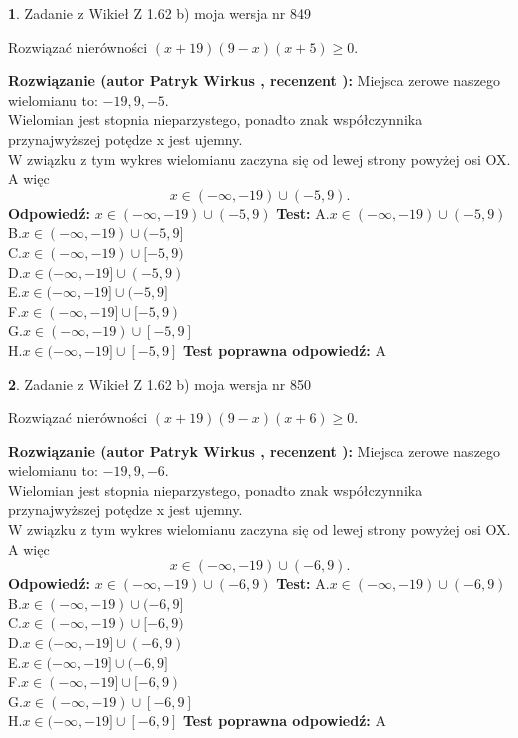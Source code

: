 \documentclass[12pt, a4paper]{article}
\theoremstyle{definition} %
\newtheorem{zad}{}
\newcommand{\zadStart}[1]{\begin{zad}#1\newline}
\newcommand{\zadStop}{\end{zad}}
\newcommand{\rozwStart}[2]{\noindent \textbf{Rozwiązanie (autor #1 , recenzent #2): }\newline}
\newcommand{\rozwStop}{\newline}
\newcommand{\odpStart}{\noindent \textbf{Odpowiedź:}\newline}
\newcommand{\odpStop}{\newline}
\newcommand{\testStart}{\noindent \textbf{Test:}\newline}
\newcommand{\testStop}{\newline}
\newcommand{\kluczStart}{\noindent \textbf{Test poprawna odpowiedź:}\newline}
\newcommand{\kluczStop}{\newline}
\begin{document}
\zadStart{Zadanie z Wikieł Z 1.62 b) moja wersja nr 849}

Rozwiązać nierówności $(x+19)(9-x)(x+5)\ge0$.
\zadStop
\rozwStart{Patryk Wirkus}{}
Miejsca zerowe naszego wielomianu to: $-19, 9, -5$.\\
Wielomian jest stopnia nieparzystego, ponadto znak współczynnika przy\linebreak najwyższej potędze x jest ujemny.\\ W związku z tym wykres wielomianu zaczyna się od lewej strony powyżej osi OX. A więc $$x \in (-\infty,-19) \cup (-5,9).$$
\rozwStop
\odpStart
$x \in (-\infty,-19) \cup (-5,9)$
\odpStop
\testStart
A.$x \in (-\infty,-19) \cup (-5,9)$\\
B.$x \in (-\infty,-19) \cup (-5,9]$\\
C.$x \in (-\infty,-19) \cup [-5,9)$\\
D.$x \in (-\infty,-19] \cup (-5,9)$\\
E.$x \in (-\infty,-19] \cup (-5,9]$\\
F.$x \in (-\infty,-19] \cup [-5,9)$\\
G.$x \in (-\infty,-19) \cup [-5,9]$\\
H.$x \in (-\infty,-19] \cup [-5,9]$
\testStop
\kluczStart
A
\kluczStop



\zadStart{Zadanie z Wikieł Z 1.62 b) moja wersja nr 850}

Rozwiązać nierówności $(x+19)(9-x)(x+6)\ge0$.
\zadStop
\rozwStart{Patryk Wirkus}{}
Miejsca zerowe naszego wielomianu to: $-19, 9, -6$.\\
Wielomian jest stopnia nieparzystego, ponadto znak współczynnika przy\linebreak najwyższej potędze x jest ujemny.\\ W związku z tym wykres wielomianu zaczyna się od lewej strony powyżej osi OX. A więc $$x \in (-\infty,-19) \cup (-6,9).$$
\rozwStop
\odpStart
$x \in (-\infty,-19) \cup (-6,9)$
\odpStop
\testStart
A.$x \in (-\infty,-19) \cup (-6,9)$\\
B.$x \in (-\infty,-19) \cup (-6,9]$\\
C.$x \in (-\infty,-19) \cup [-6,9)$\\
D.$x \in (-\infty,-19] \cup (-6,9)$\\
E.$x \in (-\infty,-19] \cup (-6,9]$\\
F.$x \in (-\infty,-19] \cup [-6,9)$\\
G.$x \in (-\infty,-19) \cup [-6,9]$\\
H.$x \in (-\infty,-19] \cup [-6,9]$
\testStop
\kluczStart
A
\kluczStop
\end{document}
